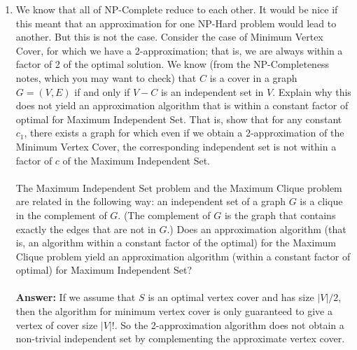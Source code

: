 \documentclass[tikz, 12pt]{scrartcl}
\begin{document}
\begin{enumerate}
	\item We know that all of NP-Complete reduce to each other. It would be nice if this meant that an approximation for one NP-Hard problem would lead to another. But this is not the case. Consider the case of Minimum Vertex Cover, for which we have a 2-approximation; that is, we are always within a factor of 2 of the optimal solution. We know (from the NP-Completeness notes, which you may want to check) that $C$ is a cover in a graph $G = (V, E)$ if and only if $V - C$ is an independent set in $V$. Explain why this does not yield an approximation algorithm that is within a constant factor of optimal for Maximum Independent Set. That is, show that for any constant $c_1$, there exists a graph for which even if we obtain a 2-approximation of the Minimum Vertex Cover, the corresponding independent set is not within a factor of $c$ of the Maximum Independent Set.\\
	\\
	The Maximum Independent Set problem and the Maximum Clique problem are related in the following way: an independent set of a graph $G$ is a clique in the complement of $G$. (The complement of $G$ is the graph that contains exactly the edges that are not in $G$.) Does an approximation algorithm (that is, an algorithm within a constant factor of the optimal) for the Maximum Clique problem yield an approximation algorithm (within a constant factor of optimal) for Maximum Independent Set?\\
\\
\textbf{Answer:} If we assume that $S$ is an optimal vertex cover and has size $|V| /2$, then the algorithm for minimum vertex cover is only guaranteed to give a vertex of cover size $|V|!$. So the 2-approximation algorithm does not obtain a non-trivial independent set by complementing the approximate vertex cover. 
	



\end{enumerate}
\end{document}
